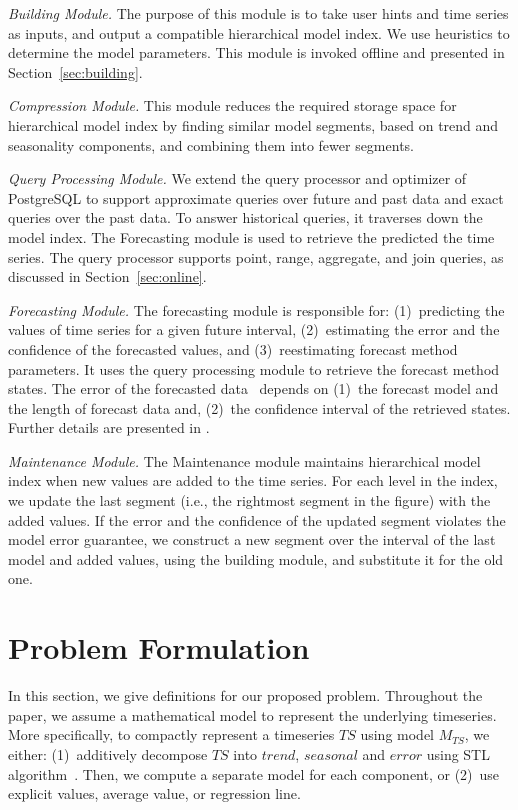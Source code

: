 \documentclass[10pt,conference,letterpaper]{IEEEtran}
\newcommand{\LN}{hierarchical model index}
\newcommand{\LNs}{hierarchical model index }
\begin{document}
{\em Building Module.}  The purpose of this  module is to take user hints and time series as inputs, and output a compatible \LN. 
We use heuristics to determine the model parameters. This module is invoked offline and presented in Section~\ref{sec:building}.

{\em Compression Module.} This module reduces the required storage space for \LNs by finding similar model segments, based on trend and seasonality components, and combining them into fewer segments. 


{\em Query Processing Module.} We extend the query processor and optimizer of PostgreSQL to support approximate queries over future and past data and exact queries over the past data. 
To answer historical queries, it traverses down the model index. The Forecasting module is used to retrieve the predicted the time series.
The query processor supports point, range, aggregate, and join queries, as discussed in Section~\ref{sec:online}. 

{\em Forecasting Module.} The forecasting module is responsible for: (1)~predicting the values of time series for a given future interval, (2)~estimating the error and the confidence of the 
forecasted values, and (3)~reestimating forecast method parameters. It uses the query processing module to retrieve the forecast method states. The error of the forecasted data~\cite{tBOX76a} depends on (1)~the forecast model and the length of forecast data and, (2)~the confidence interval of the retrieved states. Further details are presented in \cite{FRL12}.


{\em Maintenance Module.} 
The Maintenance module maintains \LNs  when new values are added to the time series.
For each level in the index,  we update the last segment (i.e., the rightmost segment in the figure) with the added values. 
If the error and the confidence of the updated segment violates the model error guarantee, we construct a new segment over the interval of the last model and added values, using the building module, and substitute it for the old one. 


\section{Problem Formulation}
\label{sec:form}
In this section, we give  definitions for our proposed problem. Throughout the paper, we assume a mathematical model to  represent the underlying timeseries. More specifically, to compactly represent a timeseries $TS$ using model  $M_{TS}$, we either: (1)~additively decompose $TS$ into $trend$, $seasonal$ and $error$ using STL algorithm~\cite{STL}. Then, we compute a separate model for each component, or (2)~use explicit values, average  value, or regression line. %
\end{document}
